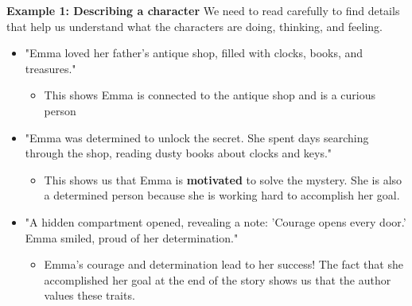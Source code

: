 \documentclass[12pt]{article}
\begin{document}
\begin{tcolorbox}[colframe=black!60, colback=white, 
coltitle=black, colbacktitle=black!15, fonttitle=\bfseries\Large, 
title=Examples, halign title=center, left=10pt, right=10pt, top=10pt, bottom=15pt]

\textbf{Example 1: Describing a character}
We need to read carefully to find details that help us understand what the characters are doing, thinking, and feeling. 
\begin{itemize}
    \item "Emma loved her father's antique shop, filled with clocks, books, and treasures."
    \begin{itemize}
        \item This shows Emma is connected to the antique shop and is a curious person
    \end{itemize}
    \item "Emma was determined to unlock the secret. She spent days searching through the shop, reading dusty books about clocks and keys."
    \begin{itemize}
        \item This shows us that Emma is \textbf{motivated} to solve the mystery. She is also a determined person because she is working hard to accomplish her goal.
    \end{itemize}
 \item "A hidden compartment opened, revealing a note: 'Courage opens every door.' Emma smiled, proud of her determination."
 \begin{itemize}
     \item Emma's courage and determination lead to her success! The fact that she accomplished her goal at the end of the story shows us that the author values these traits.
 \end{itemize}
 

\end{itemize}



 





     \end{tcolorbox}
\vspace{1em}
\end{document}
